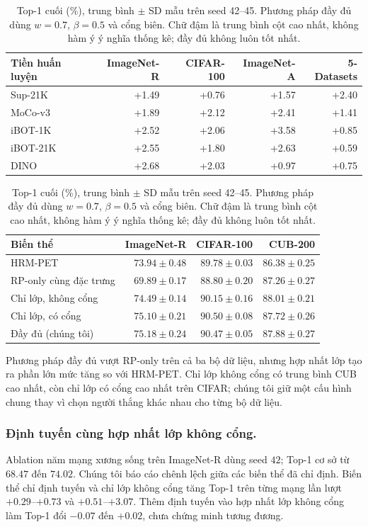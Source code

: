 \documentclass[runningheads]{llncs}
\begin{document}
\begin{table}[!ht]
\centering
\small
\setlength{\tabcolsep}{6pt}
\caption{Chênh lệch Top-1 (điểm), phương pháp đầy đủ trừ HRM-PET được ghép
ở seed $42$. Mọi ô dùng $w=0.7$, $\beta=0.5$ và cổng biên; không hàm ý
khoảng tin cậy.}
\label{tab:grid}
\begin{tabular}{lrrrr}
\toprule
Tiền huấn luyện & ImageNet-R & CIFAR-100 & ImageNet-A & 5-Datasets\\
\midrule
Sup-21K   & +1.49 & +0.76 & +1.57 & +2.40\\
MoCo-v3   & +1.89 & +2.12 & +2.41 & +1.41\\
iBOT-1K   & +2.52 & +2.06 & +3.58 & +0.85\\
iBOT-21K  & +2.55 & +1.80 & +2.63 & +0.59\\
DINO      & +2.68 & +2.03 & +0.97 & +0.75\\
\bottomrule
\end{tabular}

\vspace{.35\baselineskip}
\setlength{\tabcolsep}{5pt}
\caption{Top-1 cuối (\%), trung bình $\pm$ SD mẫu trên seed 42--45.
Phương pháp đầy đủ dùng $w=0.7$, $\beta=0.5$ và cổng biên. Chữ đậm là trung
bình cột cao nhất, không hàm ý ý nghĩa thống kê; đầy đủ không luôn tốt nhất.}
\label{tab:components}
\begin{tabular}{lrrr}
\toprule
Biến thể & ImageNet-R & CIFAR-100 & CUB-200\\
\midrule
HRM-PET & $73.94\pm0.48$ & $89.78\pm0.03$ & $86.38\pm0.25$\\
RP-only cùng đặc trưng & $69.89\pm0.17$ & $88.80\pm0.20$ & $87.26\pm0.27$\\
Chỉ lớp, không cổng & $74.49\pm0.14$ & $90.15\pm0.16$ & $\mathbf{88.01\pm0.21}$\\
Chỉ lớp, có cổng & $75.10\pm0.21$ & $\mathbf{90.50\pm0.08}$ & $87.72\pm0.26$\\
Đầy đủ (chúng tôi) & $\mathbf{75.18\pm0.24}$ & $90.47\pm0.05$ & $87.88\pm0.27$\\
\bottomrule
\end{tabular}
\end{table}

Phương pháp đầy đủ vượt RP-only trên cả ba bộ dữ liệu, nhưng hợp nhất lớp tạo
ra phần lớn mức tăng so với HRM-PET. Chỉ lớp không cổng có trung bình CUB cao
nhất, còn chỉ lớp có cổng cao nhất trên CIFAR; chúng tôi giữ một cấu hình chung
thay vì chọn người thắng khác nhau cho từng bộ dữ liệu.

\subsubsection{Định tuyến cùng hợp nhất lớp không cổng.}
Ablation năm mạng xương sống trên ImageNet-R dùng seed $42$; Top-1 cơ sở từ
$68.47$ đến $74.02$. Chúng tôi báo cáo chênh lệch giữa các biến thể đã chỉ định.
Biến thể chỉ định tuyến và chỉ lớp không cổng tăng Top-1 trên từng mạng lần
lượt $+0.29$--$+0.73$ và $+0.51$--$+3.07$. Thêm định tuyến vào hợp nhất lớp
không cổng làm Top-1 đổi $-0.07$ đến $+0.02$, chưa chứng minh tương đương.
\end{document}
